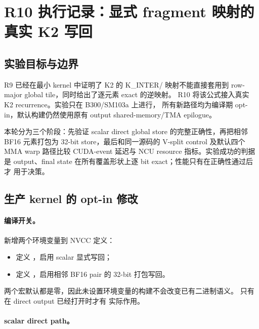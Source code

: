 \section{R10 执行记录：显式 fragment 映射的真实 K2 写回}

\subsection{实验目标与边界}

R9 已经在最小 kernel 中证明了 K2 的 K\_INTER/
映射不能直接套用到 row-major global tile，同时给出了逐元素 exact 的逆映射。
R10 将该公式接入真实 \FlashKDA K2 recurrence。实验只在 B300/SM103a 上进行，
所有新路径均为编译期 opt-in，默认构建仍然使用原有 output shared-memory/TMA
epilogue。

本轮分为三个阶段：先验证 scalar direct global store 的完整正确性，再把相邻
BF16 元素打包为 32-bit store，最后和同一源码的 V-split control 及默认四个
MMA warp 路径比较 CUDA-event 延迟与 NCU resource 指标。实验成功的判据是
output、final state 在所有覆盖形状上逐 bit exact；性能只有在正确性通过后才
用于决策。

\subsection{生产 kernel 的 opt-in 修改}

\paragraph{编译开关。}

 新增两个环境变量到 NVCC 定义：

\begin{itemize}
  \item {} 定义
        ，启用 scalar 显式写回；
  \item {} 定义
        ，启用相邻 BF16 pair 的
        32-bit 打包写回。
\end{itemize}

两个宏默认都是零，因此未设置环境变量的构建不会改变已有二进制语义。
 只有在 direct output 已经打开时才有
实际作用。

\paragraph{scalar direct path。}

